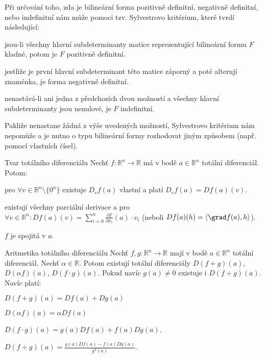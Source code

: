 \begin{poznamka}
Při určování toho, zda je bilineární forma pozitivně definitní, negativně definitní, nebo indefinitní nám může pomoci tzv. Sylvestrovo kritérium, které tvrdí následující:
\begin{pitemize}
\item jsou-li všechny hlavní subdeterminanty matice reprezentující bilineární formu $F$ kladné, potom je $F$ pozitivně definitní.
\item jestliže je první hlavní subdeterminant této matice záporný a poté alterují znaménka, je forma negativně definitní.
\item nenastává-li ani jedna z předchozích dvou možností a všechny hlavní subdeterminanty jsou nenulové, je $F$ indefinitní.
\end{pitemize}
Pakliže nenastane žádná z výše uvedených možností, Sylvestrovo kritérium nám nepomůže a je nutno o typu bilineární formy rozhodovat jiným způsobem (např. pomocí vlastních čísel).
\end{poznamka}

\begin{vetaN}{Tvar totálního diferenciálu}
Nechť $f: \mathbb{R}^n \rightarrow \mathbb{R}$ má v bodě $a \in \mathbb{R}^n$ totální diferenciál. Potom:
\begin{pitemize}
\item pro $\forall v \in \mathbb{R}^n\setminus\{0^n\}$ existuje $D_vf(a)$ vlastní a platí $D_vf(a) = Df(a)(v)$.
\item existují všechny parciální derivace a pro $\forall v \in \mathbb{R}^n: Df(a)(v) = \sum_{i=0}^n\frac{\partial f}{\partial x_i}(a) \cdot v_i$ (neboli $Df(a)(h) = \left<\grad f(a), h\right>$).
\item $f$ je spojitá v $a$.
\end{pitemize}
\end{vetaN}

\begin{vetaN}{Aritmetika totálního diferenciálu}
Nechť $f, g: \mathbb{R}^n \rightarrow \mathbb{R}$ mají v bodě $a \in \mathbb{R}^n$ totální diferenciál. Nechť $\alpha \in \mathbb{R}$. Potom existují totální diferenciály $D(f + g)(a)$, $D(\alpha f)(a)$, $D(f \cdot g)(a)$. Pokud navíc $g(a) \neq 0$ existuje i $D(f \div g)(a)$. Navíc platí:
\begin{pitemize}
\item $D(f + g)(a) = Df(a) + Dg(a)$
\item $D(\alpha f)(a) = \alpha Df(a)$
\item $D(f \cdot g)(a) = g(a)Df(a) + f(a)Dg(a)$.
\item $D(f \div g)(a) = \frac{g(a)Df(a) - f(a)Dg(a)}{g^2(a)}$.
\end{pitemize}
\end{vetaN}

